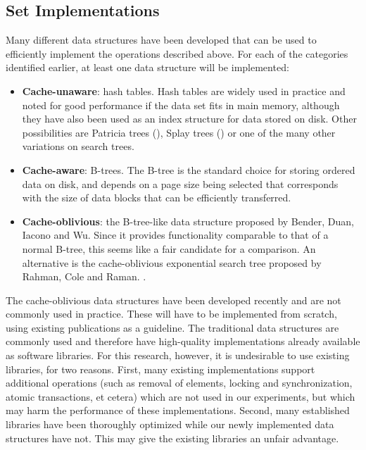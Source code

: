 \documentclass{acm_proc_article-sp}
\begin{document}
\subsection{Set Implementations}
Many different data structures have been developed that can be used to efficiently implement the operations described above. For each of the categories identified earlier, at least one data structure will be implemented:
\begin{itemize}
\item \textbf{Cache-unaware}: hash tables. Hash tables are widely used in practice and noted for good performance if the data set fits in main memory, although they have also been used as an index structure for data stored on disk. Other possibilities are Patricia trees (\cite{morrison1968ppa}), Splay trees (\cite{sleator1985sab}) or one of the many other variations on search trees.
\item \textbf{Cache-aware}: B-trees. The B-tree is the standard choice for storing ordered data on disk, and depends on a page size being selected that corresponds with the size of data blocks that can be efficiently transferred.
\item \textbf{Cache-oblivious}: the B-tree-like data structure proposed by Bender, Duan, Iacono and Wu. Since it provides functionality comparable to that of a normal B-tree, this seems like a fair candidate for a comparison. An alternative is the cache-oblivious exponential search tree proposed by Rahman, Cole and Raman. \cite{rahman2001opd}.
\end{itemize}

The cache-oblivious data structures have been developed recently and are not commonly used in practice. These will have to be implemented from scratch, using existing publications as a guideline. The traditional data structures are commonly used and therefore have high-quality implementations already available as software libraries. For this research, however, it is undesirable to use existing libraries, for two reasons. First, many existing implementations support additional operations (such as removal of elements, locking and synchronization, atomic transactions, et cetera) which are not used in our experiments, but which may harm the performance of these implementations. Second, many established libraries have been thoroughly optimized while our newly implemented data structures have not. This may give the existing libraries an unfair advantage.
\end{document}
